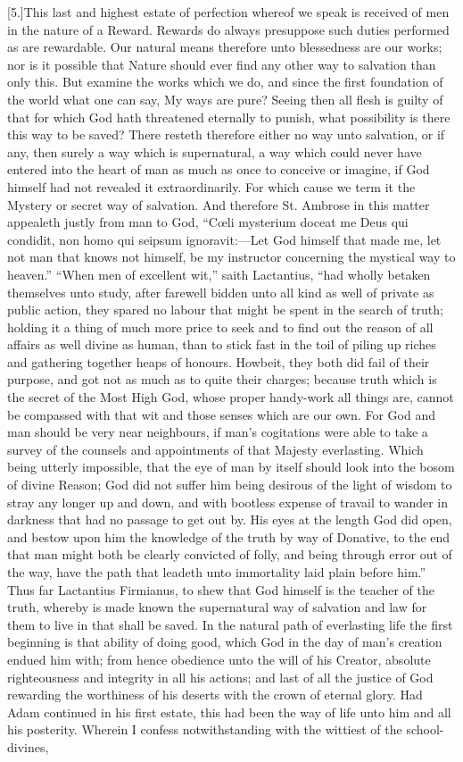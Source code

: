 [5.]This last and highest estate of perfection whereof we speak is received of men in the nature of a Reward. Rewards do always presuppose such duties performed as are rewardable. Our natural means therefore unto blessedness are our works; nor is it possible that Nature should ever find any other way to salvation than only this. But examine the works which we do, and since the first foundation of the world what one can say, My ways are pure? Seeing then all flesh is guilty of that for which God hath threatened eternally to punish, what possibility is there this way to be saved? There resteth therefore either no way unto salvation, or if any, then surely a way which is supernatural, a way which could never have entered into the heart of man as much as once to conceive or imagine, if God himself had not revealed it extraordinarily. For which cause we term it the Mystery or secret way of salvation. And therefore St. Ambrose in this matter appealeth justly from man to God, “Cœli mysterium doceat me Deus qui condidit, non homo qui seipsum ignoravit:—Let God himself that made me, let not man that knows not himself, be my instructor concerning the mystical way to heaven.” “When men of excellent wit,” saith Lactantius, “had wholly betaken themselves unto study, after farewell bidden unto all kind as well of private as public action, they spared no labour that might be spent in the  search of truth; holding it a thing of much more price to seek and to find out the reason of all affairs as well divine as human, than to stick fast in the toil of piling up riches and gathering together heaps of honours. Howbeit, they both did fail of their purpose, and got not as much as to quite their charges; because truth which is the secret of the Most High God, whose proper handy-work all things are, cannot be compassed with that wit and those senses which are our own. For God and man should be very near neighbours, if man’s cogitations were able to take a survey of the counsels and appointments of that Majesty everlasting. Which being utterly impossible, that the eye of man by itself should look into the bosom of divine Reason; God did not suffer him being desirous of the light of wisdom to stray any longer up and down, and with bootless expense of travail to wander in darkness that had no passage to get out by. His eyes at the length God did open, and bestow upon him the knowledge of the truth by way of Donative, to the end that man might both be clearly convicted of folly, and being through error out of the way, have the path that leadeth unto immortality laid plain before him.” Thus far Lactantius Firmianus, to shew that God himself is the teacher of the truth, whereby is made known the supernatural way of salvation and law for them to live in that shall be saved. In the natural path of everlasting life the first beginning is that  ability of doing good, which God in the day of man’s creation endued him with; from hence obedience unto the will of his Creator, absolute righteousness and integrity in all his actions; and last of all the justice of God rewarding the worthiness of his deserts with the crown of eternal glory. Had Adam continued in his first estate, this had been the way of life unto him and all his posterity. Wherein I confess notwithstanding with the wittiest of the school-divines, 